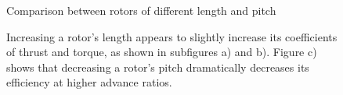\documentclass{article}
\begin{document}
\begin{figure}
  \centering
  \caption{Comparison between rotors of different length and pitch}
  \captionsetup{aboveskip=0pt,font=it}
  \caption*{Increasing a rotor's length appears to slightly increase its coefficients of thrust and torque, as shown in subfigures a) and b). Figure c) shows that decreasing a rotor's pitch dramatically decreases its efficiency at higher advance ratios.}
  \label{fig:3}
\end{figure}
\end{document}
